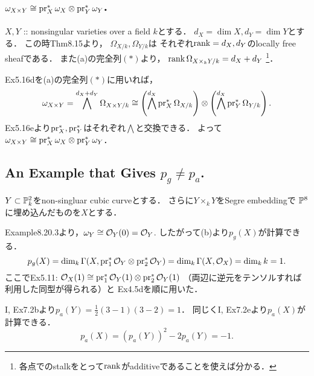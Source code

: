 \documentclass[a4paper]{jsarticle}
\newcommand{\Der}{\Omega}
\newcommand{\shCano}{\omega}
\begin{document}
    \subsection{$\shCano_{X \times Y} \iso \pr_X^*\shCano_{X} \otimes \pr_Y^*\shCano_{Y}$.}
    $X, Y$ :: nonsingular varieties over a field $k$とする．
    $d_X=\dim X, d_Y=\dim Y$とする．
    この時Thm8.15より，
    $\Der_{X/k}, \Der_{Y/k}$は
    それぞれ$\operatorname{rank}=d_X, d_Y$のlocally free sheafである．
    また(a)の完全列$(*)$より，
    $\rank \Der_{X \times_k Y/k}=d_X+d_Y$
    \footnote
    {
        各点でのstalkをとって$\operatorname{rank}$がadditiveであることを使えば分かる．
    }．

    Ex5.16dを(a)の完全列$(*)$に用いれば，
    \[
        \shCano_{X \times Y}
        =\bigwedge^{d_X+d_Y}\Der_{X \times Y/k}
        \iso \left( \bigwedge^{d_X}\pr_X^* \Der_{X/k} \right)
            \otimes \left( \bigwedge^{d_X}\pr_Y^* \Der_{Y/k} \right).
    \]
    Ex5.16eより$\operatorname{pr}_X^*, \operatorname{pr}_Y^*$はそれぞれ$\bigwedge$と交換できる．
    よって$\shCano_{X \times Y} \iso \pr_X^*\shCano_{X} \otimes \pr_Y^*\shCano_{Y}$．

    \subsection{An Example that Gives $p_g \neq p_a$.}
    $Y \subset \mathbb{P}^2_k$をnon-singluar cubic curveとする．
    さらに$Y \times_k Y$をSegre embeddingで
    $\mathbb{P}^8$に埋め込んだものを$X$とする．

    Example8.20.3より，$\shCano_Y \iso \shO_Y(0)=\shO_Y$.
    したがって(b)より$p_g(X)$が計算できる．
    \[
        p_g(X)
        =\dim_k \Gamma(X, \operatorname{pr}_1^*\mathcal{O}_Y \otimes \operatorname{pr}_2^* \mathcal{O}_Y)
        =\dim_k \Gamma(X, \mathcal{O}_X)
        =\dim_k k
        =1.
    \]
    ここでEx5.11:
    $\mathcal{O}_X(1) \cong \operatorname{pr}_1^*\mathcal{O}_Y(1) \otimes \operatorname{pr}_2^* \mathcal{O}_Y(1)$
    （両辺に逆元をテンソルすれば利用した同型が得られる）と
    Ex4.5dを順に用いた．

    I, Ex7.2bより$p_a(Y)=\frac{1}{2}(3-1)(3-2)=1$．
    同じくI, Ex7.2eより$p_a(X)$が計算できる．
    \[ p_a(X)=(p_a(Y))^2-2p_a(Y)=-1. \]
\end{document}

